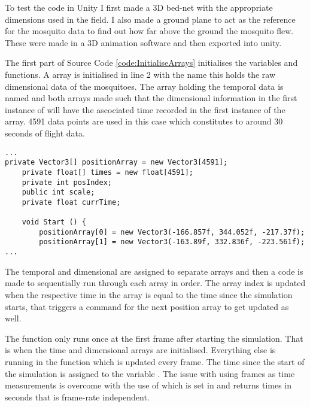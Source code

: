 To test the code in Unity I first made a 3D bed-net with the appropriate dimensions used in the field. I also made a ground plane to act as the reference for the mosquito data to find out how far above the ground the mosquito flew. These were made in a 3D animation software and then exported into unity.


The first part of Source Code \ref{code:InitialiseArrays} initialises the variables and functions. A  array is initialised in line 2 with the name  this holds the raw dimensional data of the mosquitoes. The array holding the temporal data is named  and both arrays made such that the dimensional information in the first instance of  will have the ascociated time recorded in the first instance of the  array. 4591 data points are used in this case which constitutes to around 30 seconds of flight data.

\bigskip
\begin{code1}
\begin{verbatim}
...
private Vector3[] positionArray = new Vector3[4591];
	private float[] times = new float[4591];
	private int posIndex;
	public int scale;
	private float currTime;

	void Start () {
		positionArray[0] = new Vector3(-166.857f, 344.052f, -217.37f);
		positionArray[1] = new Vector3(-163.89f, 332.836f, -223.561f);
...
\end{verbatim}

\label{code:InitialiseArrays}
\end{code1}

The temporal and dimensional are assigned to separate arrays and then a code is made to sequentially run through each array in order. The array index is updated when the respective time in the array is equal to the time since the simulation starts, that triggers a command for the next position array to get updated as well.

The  function only runs once at the first frame after starting the simulation. That is when the time and dimensional arrays are initialised. Everything else is running in the function  which is updated every frame. The time since the start of the simulation is assigned to the variable . The issue with using frames as time measurements is overcome with the use of  which is set in  and returns times in seconds that is frame-rate independent.

